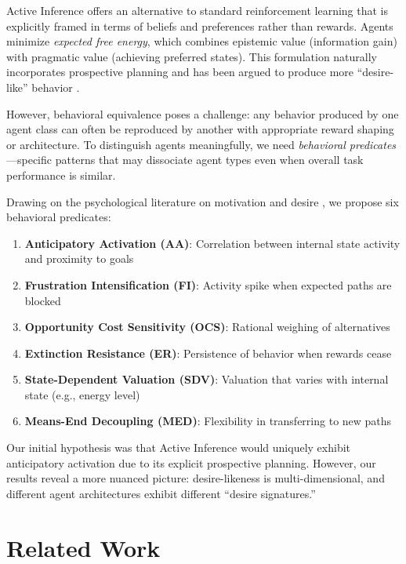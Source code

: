 \documentclass{article}
\begin{document}
Active Inference \cite{friston2010free, parr2022active} offers an alternative to standard reinforcement learning that is explicitly framed in terms of beliefs and preferences rather than rewards. Agents minimize \textit{expected free energy}, which combines epistemic value (information gain) with pragmatic value (achieving preferred states). This formulation naturally incorporates prospective planning and has been argued to produce more ``desire-like'' behavior \cite{seth2021being}.

However, behavioral equivalence poses a challenge: any behavior produced by one agent class can often be reproduced by another with appropriate reward shaping or architecture. To distinguish agents meaningfully, we need \textit{behavioral predicates}---specific patterns that may dissociate agent types even when overall task performance is similar.

Drawing on the psychological literature on motivation and desire \cite{berridge2009dissecting}, we propose six behavioral predicates:
\begin{enumerate}
    \item \textbf{Anticipatory Activation (AA)}: Correlation between internal state activity and proximity to goals
    \item \textbf{Frustration Intensification (FI)}: Activity spike when expected paths are blocked
    \item \textbf{Opportunity Cost Sensitivity (OCS)}: Rational weighing of alternatives
    \item \textbf{Extinction Resistance (ER)}: Persistence of behavior when rewards cease
    \item \textbf{State-Dependent Valuation (SDV)}: Valuation that varies with internal state (e.g., energy level)
    \item \textbf{Means-End Decoupling (MED)}: Flexibility in transferring to new paths
\end{enumerate}

Our initial hypothesis was that Active Inference would uniquely exhibit anticipatory activation due to its explicit prospective planning. However, our results reveal a more nuanced picture: desire-likeness is multi-dimensional, and different agent architectures exhibit different ``desire signatures.''

\section{Related Work}
\end{document}

